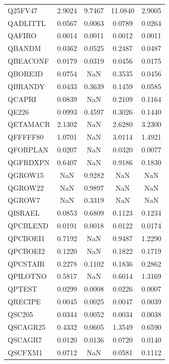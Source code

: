 \begin{longtable}{lcccc}
Q25FV47  &   2.9024 &   9.7467 &  11.0840 &   2.9005 \\
QADLITTL &   0.0567 &   0.0063 &   0.0789 &   0.0264 \\
QAFIRO   &   0.0014 &   0.0011 &   0.0012 &   0.0011 \\
QBANDM   &   0.0362 &   0.0525 &   0.2487 &   0.0487 \\
QBEACONF &   0.0179 &   0.0319 &   0.0456 &   0.0175 \\
QBORE3D  &   0.0754 &      NaN &   0.3535 &   0.0456 \\
QBRANDY  &   0.0433 &   0.3639 &   0.1459 &   0.0585 \\
QCAPRI   &   0.0839 &      NaN &   0.2109 &   0.1164 \\
QE226    &   0.0993 &   0.4597 &   0.3026 &   0.1440 \\
QETAMACR &   2.1302 &      NaN &   2.6280 &   3.2300 \\
QFFFFF80 &   1.0701 &      NaN &   3.0114 &   1.4921 \\
QFORPLAN &   0.0207 &      NaN &   0.0320 &   0.0077 \\
QGFRDXPN &   0.6407 &      NaN &   0.9186 &   0.1830 \\
QGROW15  &      NaN &   0.9282 &      NaN &      NaN \\
QGROW22  &      NaN &   0.9897 &      NaN &      NaN \\
QGROW7   &      NaN &   0.3319 &      NaN &      NaN \\
QISRAEL  &   0.0853 &   0.6809 &   0.1123 &   0.1234 \\
QPCBLEND &   0.0191 &   0.0018 &   0.0122 &   0.0174 \\
QPCBOEI1 &   0.7192 &      NaN &   0.9487 &   1.2290 \\
QPCBOEI2 &   0.1220 &      NaN &   0.1822 &   0.1719 \\
QPCSTAIR &   0.2278 &   0.1102 &   0.1836 &   0.2862 \\
QPILOTNO &   0.5817 &      NaN &   0.6014 &   1.3169 \\
QPTEST   &   0.0299 &   0.0008 &   0.0226 &   0.0007 \\
QRECIPE  &   0.0045 &   0.0025 &   0.0047 &   0.0039 \\
QSC205   &   0.0344 &   0.0052 &   0.0034 &   0.0038 \\
QSCAGR25 &   0.4332 &   0.0605 &   1.3549 &   0.6590 \\
QSCAGR7  &   0.0120 &   0.0136 &   0.0720 &   0.0140 \\
QSCFXM1  &   0.0712 &      NaN &   0.0581 &   0.1112 \\

\end{longtable}
